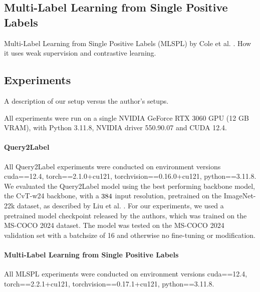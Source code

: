 \documentclass[lettersize,journal]{IEEEtran}
\begin{document}
\subsection{Multi-Label Learning from Single Positive Labels}
Multi-Label Learning from Single Positive Labels (MLSPL) by Cole et al. \cite{mlsp}.
How it uses weak supervision and contrastive learning.


\subsection{Experiments}
A description of our setup versus the author's setups.

\vspace{1em}

All experiments were run on a single NVIDIA GeForce RTX 3060 GPU (12 GB VRAM), with Python 3.11.8, NVIDIA driver 550.90.07 and CUDA 12.4. 


\paragraph{Query2Label}
All Query2Label experiments were conducted on environment versions cuda==12.4, torch==2.1.0+cu121, torchvision==0.16.0+cu121, python==3.11.8.
We evaluated the Query2Label model using the best performing backbone model, the CvT-w24 backbone, with a $384\time 384$ input resolution, pretrained on the ImageNet-22k dataset, as described by Liu et al. \cite{Query2Label}. For our experiments, we used a pretrained model checkpoint released by the authors, which was trained on the MS-COCO 2024 dataset. The model was tested on the MS-COCO 2024 validation set with a batchsize of 16 and otherwise no fine-tuning or modification.


\paragraph{Multi-Label Learning from Single Positive Labels}
All MLSPL experiments were conducted on environment versions cuda==12.4, torch==2.2.1+cu121, torchvision==0.17.1+cu121, python==3.11.8.
\end{document}
